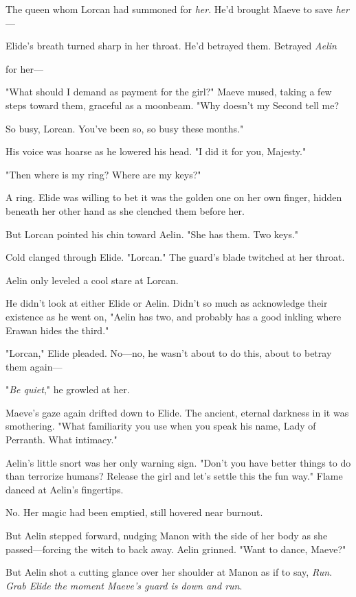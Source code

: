 The queen whom Lorcan had summoned for \emph{her}.
He'd brought Maeve to save \emph{her}---

Elide's breath turned sharp in her throat.
He'd betrayed them.
Betrayed \emph{Aelin}

for her---

"What should I demand as payment for the girl?"
Maeve mused, taking a few steps toward them, graceful as a moonbeam.
"Why doesn't my Second tell me?

So busy, Lorcan.
You've been so, so busy these months."

His voice was hoarse as he lowered his head.
"I did it for you, Majesty."

"Then where is my ring?
Where are my keys?"

A ring.
Elide was willing to bet it was the golden one on her own finger, hidden beneath her other hand as she clenched them before her.

But Lorcan pointed his chin toward Aelin.
"She has them.
Two keys."

Cold clanged through Elide.
"Lorcan."
The guard's blade twitched at her throat.

Aelin only leveled a cool stare at Lorcan.

He didn't look at either Elide or Aelin.
Didn't so much as acknowledge their existence as he went on, "Aelin has two, and probably has a good inkling where Erawan hides the third."

"Lorcan," Elide pleaded.
No---no, he wasn't about to do this, about to betray them again---

"\emph{Be quiet}," he growled at her.

Maeve's gaze again drifted down to Elide.
The ancient, eternal darkness in it was smothering.
"What familiarity you use when you speak his name, Lady of Perranth.
What intimacy."

Aelin's little snort was her only warning sign.
"Don't you have better things to do than terrorize humans?
Release the girl and let's settle this the fun way."
Flame danced at Aelin's fingertips.

No.
Her magic had been emptied, still hovered near burnout.

But Aelin stepped forward, nudging Manon with the side of her body as she passed---forcing the witch to back away.
Aelin grinned.
"Want to dance, Maeve?"

But Aelin shot a cutting glance over her shoulder at Manon as if to say,
\emph{Run}.
\emph{Grab Elide the moment Maeve's guard is down and run}.

